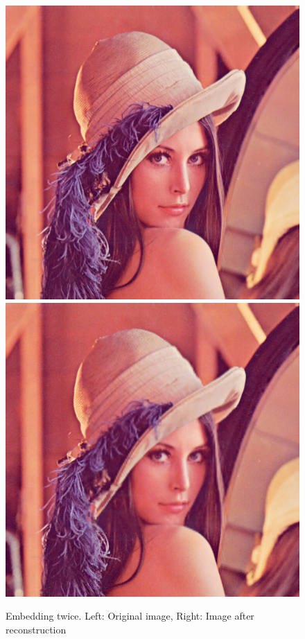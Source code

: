 \documentclass[12pt]{article}
\begin{document}
\begin{figure}[h]
\centerline{%
\includegraphics[scale=0.45]{"lena"}%
\hspace{0.1cm}
\includegraphics[scale=0.45]{"Lena Embed twice 0.7 threshold/finalImageAfterRestoration"}%
}%
\caption{Embedding twice. Left: Original image, Right: Image after reconstruction}
\label{fig:lenaEmbedTwiceRestoration}
\end{figure}
\end{document}
